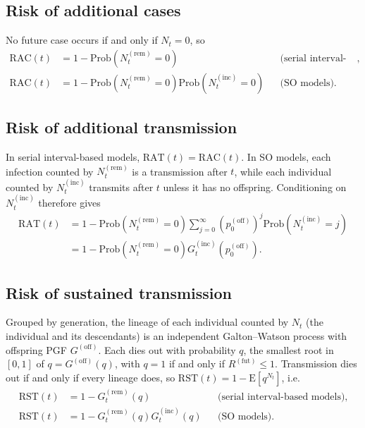 \documentclass{article}
\newcommand{\offPMF}{p^{(\mathrm{off})}}
\newcommand{\offPGF}{G^{(\mathrm{off})}}
\newcommand{\Rfut}{R^{(\mathrm{fut})}}
\newcommand{\RAC}{\mathrm{RAC}}
\newcommand{\RAT}{\mathrm{RAT}}
\newcommand{\RST}{\mathrm{RST}}
\newcommand{\Prob}[1]{\mathrm{Prob}\left(#1\right)}
\newcommand{\E}[1]{\mathrm{E}\left[#1\right]}
\begin{document}
\subsection{Risk of additional cases}

No future case occurs if and only if \(N_t=0\), so
\begin{align}
  \RAC(t)&=1-\Prob{N_t^{(\mathrm{rem})}=0}
  &&\text{(serial interval-based models)},\\
  \RAC(t)&=1-\Prob{N_t^{(\mathrm{rem})}=0}\Prob{N_t^{(\mathrm{inc})}=0}
  &&\text{(SO models)}.
\end{align}

\subsection{Risk of additional transmission}

In serial interval-based models, \(\RAT(t)=\RAC(t)\). In SO models, each
infection counted by \(N_t^{(\mathrm{rem})}\) is a transmission after
\(t\), while each
individual counted by \(N_t^{(\mathrm{inc})}\) transmits after \(t\) unless
it has no offspring. Conditioning on \(N_t^{(\mathrm{inc})}\) therefore
gives
\begin{align}
  \nonumber\RAT(t)
  &=1-\Prob{N_t^{(\mathrm{rem})}=0}\sum_{j=0}^{\infty}\left(\offPMF_0\right)^{j}
  \Prob{N_t^{(\mathrm{inc})}=j}\\
  &=1-\Prob{N_t^{(\mathrm{rem})}=0}G_t^{(\mathrm{inc})}\left(\offPMF_0\right).
\end{align}

\subsection{Risk of sustained transmission}

Grouped by generation, the lineage of each individual counted by \(N_t\)
(the individual and its descendants) is an independent Galton--Watson
process with offspring PGF \(\offPGF\). Each dies out with probability
\(q\), the smallest root in \([0,1]\) of \(q=\offPGF(q)\), with \(q=1\) if
and only if \(\Rfut\leq1\). Transmission dies out if and only if every
lineage does, so \(\RST(t)=1-\E{q^{N_t}}\), i.e.
\begin{align}
  \RST(t)&=1-G_t^{(\mathrm{rem})}(q)
  &&\text{(serial interval-based models)},\\
  \RST(t)&=1-G_t^{(\mathrm{rem})}(q)G_t^{(\mathrm{inc})}(q)
  &&\text{(SO models)}.
\end{align}
\end{document}
